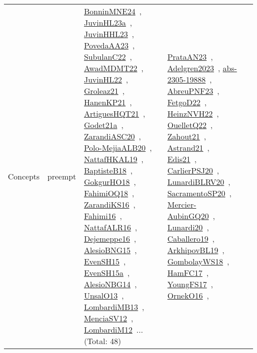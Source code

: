 {\begin{longtable}{lp{3cm}>{\raggedright\arraybackslash}p{6cm}>{\raggedright\arraybackslash}p{6cm}>{\raggedright\arraybackslash}p{8cm}}
Concepts & preempt & \href{../works/BonninMNE24.pdf}{BonninMNE24}~\cite{BonninMNE24}, \href{../works/JuvinHL23a.pdf}{JuvinHL23a}~\cite{JuvinHL23a}, \href{../works/JuvinHHL23.pdf}{JuvinHHL23}~\cite{JuvinHHL23}, \href{../works/PovedaAA23.pdf}{PovedaAA23}~\cite{PovedaAA23}, \href{../works/SubulanC22.pdf}{SubulanC22}~\cite{SubulanC22}, \href{../works/AwadMDMT22.pdf}{AwadMDMT22}~\cite{AwadMDMT22}, \href{../works/JuvinHL22.pdf}{JuvinHL22}~\cite{JuvinHL22}, \href{../works/Groleaz21.pdf}{Groleaz21}~\cite{Groleaz21}, \href{../works/HanenKP21.pdf}{HanenKP21}~\cite{HanenKP21}, \href{../works/ArtiguesHQT21.pdf}{ArtiguesHQT21}~\cite{ArtiguesHQT21}, \href{../works/Godet21a.pdf}{Godet21a}~\cite{Godet21a}, \href{../works/ZarandiASC20.pdf}{ZarandiASC20}~\cite{ZarandiASC20}, \href{../works/Polo-MejiaALB20.pdf}{Polo-MejiaALB20}~\cite{Polo-MejiaALB20}, \href{../works/NattafHKAL19.pdf}{NattafHKAL19}~\cite{NattafHKAL19}, \href{../works/BaptisteB18.pdf}{BaptisteB18}~\cite{BaptisteB18}, \href{../works/GokgurHO18.pdf}{GokgurHO18}~\cite{GokgurHO18}, \href{../works/FahimiOQ18.pdf}{FahimiOQ18}~\cite{FahimiOQ18}, \href{../works/ZarandiKS16.pdf}{ZarandiKS16}~\cite{ZarandiKS16}, \href{../works/Fahimi16.pdf}{Fahimi16}~\cite{Fahimi16}, \href{../works/NattafALR16.pdf}{NattafALR16}~\cite{NattafALR16}, \href{../works/Dejemeppe16.pdf}{Dejemeppe16}~\cite{Dejemeppe16}, \href{../works/AlesioBNG15.pdf}{AlesioBNG15}~\cite{AlesioBNG15}, \href{../works/EvenSH15.pdf}{EvenSH15}~\cite{EvenSH15}, \href{../works/EvenSH15a.pdf}{EvenSH15a}~\cite{EvenSH15a}, \href{../works/AlesioNBG14.pdf}{AlesioNBG14}~\cite{AlesioNBG14}, \href{../works/UnsalO13.pdf}{UnsalO13}~\cite{UnsalO13}, \href{../works/LombardiMB13.pdf}{LombardiMB13}~\cite{LombardiMB13}, \href{../works/MenciaSV12.pdf}{MenciaSV12}~\cite{MenciaSV12}, \href{../works/LombardiM12.pdf}{LombardiM12}~\cite{LombardiM12}... (Total: 48) & \href{../works/PrataAN23.pdf}{PrataAN23}~\cite{PrataAN23}, \href{../works/Adelgren2023.pdf}{Adelgren2023}~\cite{Adelgren2023}, \href{../works/abs-2305-19888.pdf}{abs-2305-19888}~\cite{abs-2305-19888}, \href{../works/AbreuPNF23.pdf}{AbreuPNF23}~\cite{AbreuPNF23}, \href{../works/FetgoD22.pdf}{FetgoD22}~\cite{FetgoD22}, \href{../works/HeinzNVH22.pdf}{HeinzNVH22}~\cite{HeinzNVH22}, \href{../works/OuelletQ22.pdf}{OuelletQ22}~\cite{OuelletQ22}, \href{../works/Zahout21.pdf}{Zahout21}~\cite{Zahout21}, \href{../works/Astrand21.pdf}{Astrand21}~\cite{Astrand21}, \href{../works/Edis21.pdf}{Edis21}~\cite{Edis21}, \href{../works/CarlierPSJ20.pdf}{CarlierPSJ20}~\cite{CarlierPSJ20}, \href{../works/LunardiBLRV20.pdf}{LunardiBLRV20}~\cite{LunardiBLRV20}, \href{../works/SacramentoSP20.pdf}{SacramentoSP20}~\cite{SacramentoSP20}, \href{../works/Mercier-AubinGQ20.pdf}{Mercier-AubinGQ20}~\cite{Mercier-AubinGQ20}, \href{../works/Lunardi20.pdf}{Lunardi20}~\cite{Lunardi20}, \href{../works/Caballero19.pdf}{Caballero19}~\cite{Caballero19}, \href{../works/ArkhipovBL19.pdf}{ArkhipovBL19}~\cite{ArkhipovBL19}, \href{../works/GombolayWS18.pdf}{GombolayWS18}~\cite{GombolayWS18}, \href{../works/HamFC17.pdf}{HamFC17}~\cite{HamFC17}, \href{../works/YoungFS17.pdf}{YoungFS17}~\cite{YoungFS17}, \href{../works/OrnekO16.pdf}{OrnekO16}~\cite{OrnekO16}, 
\end{longtable}}
